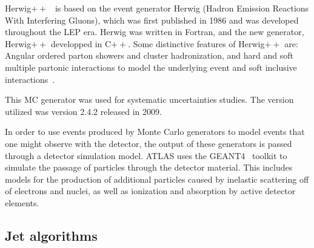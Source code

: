 {\sc Herwig}$++$~\cite{HerwigPP} is based on the event generator {\sc Herwig} (Hadron Emission Reactions With Interfering Gluons), which was first published in 1986 and was developed throughout the LEP era.  {\sc Herwig} was written in Fortran, and the new generator, Herwig$++$ developped in C$++$. 
Some distinctive features of Herwig$++$ are: Angular ordered parton showers and cluster hadronization, and 
hard and soft multiple partonic interactions to model the underlying event and soft inclusive interactions~\cite{1126-6708-2008-07-07}.

This MC generator was used for systematic uncertainties studies. The version utilized was version 2.4.2 released in 2009. 


In order to use events produced by Monte Carlo generators to model events that one might observe with the detector, the output of these generators is passed through a detector simulation model.  ATLAS uses the GEANT4~\cite{Geant4} toolkit to simulate the passage of particles through the detector material. This includes models for the production of additional particles caused by inelastic scattering off of electrons and nuclei, as well as ionization and absorption by active detector elements.


\subsection{Jet algorithms}\label{sec:jetalgos}


